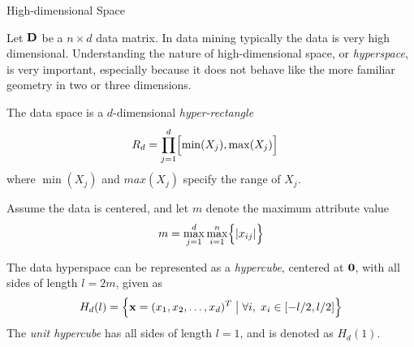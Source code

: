 
\date{Chapter 6: High-dimensional Data}

\begin{frame}
\titlepage
\end{frame}


\begin{frame}{High-dimensional Space}
\small

Let $\mathbf{D}$ be a $n\times d$ data matrix. 
In data mining typically the data is very high dimensional.
Understanding the nature of high-dimensional space, or
{\em hyperspace}, is very important, especially because it
does not behave like the more familiar geometry in two or three
dimensions.


 The data space is a 
$d$-dimensional
{\em hyper-rectangle}
\begin{align*}
    R_d & = \prod_{j=1}^{d} \Bigl[\min(X_{j}), \max(X_{j})\Bigr]
\end{align*}
where $\min(X_j)$ and $max(X_j)$ specify the range of $X_j$.

Assume the data is centered, and let $m$ 
denote the maximum attribute value
\begin{align*}
    m = \max_{j=1}^d \max_{i=1}^n \Bigl\{ \lvert x_{ij}\rvert \Bigr\}
\end{align*}

The data hyperspace can be represented as a {\em hypercube}, centered
at $\mathbf{0}$, with all sides of length $l=2m$, given as
\begin{align*}
    H_d(l) = \Bigl\{\mathbf{x} = (x_1, x_2, \ldots, x_d)^T \; \big|
    \; \forall i,\;
	x_i \in [-l/2, l/2] \Bigr\}
\end{align*}
The {\em unit hypercube} has all sides
of length $l=1$, and is denoted as $H_d(1)$.
\end{frame}


